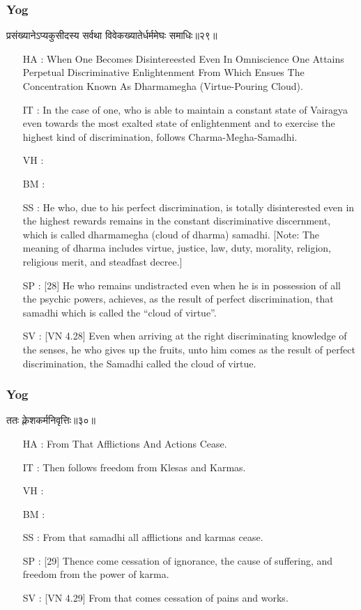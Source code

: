 \begin{frame}[fragile]\frametitle{Yog}
\begin{sanskrit}
प्रसंख्यानेऽप्यकुसीदस्य सर्वथा विवेकख्यातेर्धर्ममेघः समाधिः॥२९॥
\end{sanskrit}

	\begin{itemize}
	\item [HA]: When One Becomes Disintereested Even In Omniscience One Attains Perpetual Discriminative Enlightenment From Which Ensues The Concentration Known As Dharmamegha (Virtue-Pouring Cloud).
	\item [IT]: In the case of one, who is able to maintain a constant state of Vairagya even towards the most exalted state of enlightenment and to exercise the highest kind of discrimination, follows Charma-Megha-Samadhi.
	\item [VH]: 
	\item [BM]: 
	\item [SS]: He who, due to his perfect discrimination, is totally disinterested even in the highest rewards remains in the constant discriminative discernment, which is called dharmamegha (cloud of dharma) samadhi. [Note: The meaning of dharma includes virtue, justice, law, duty, morality, religion, religious merit, and steadfast decree.]
	\item [SP]: [28] He who remains undistracted even when he is in possession of all the psychic powers, achieves, as the result of perfect discrimination, that samadhi which is called the “cloud of virtue”.
	\item [SV]: [VN 4.28] Even when arriving at the right discriminating knowledge of the senses, he who gives up the fruits, unto him comes as the result of perfect discrimination, the Samadhi called the cloud of virtue. 
	\end{itemize}
\end{frame}


\begin{frame}[fragile]\frametitle{Yog}
\begin{sanskrit}
ततः क्लेशकर्मनिवृत्तिः॥३०॥
\end{sanskrit}

	\begin{itemize}
	\item [HA]: From That Afflictions And Actions Cease.
	\item [IT]: Then follows freedom from Klesas and Karmas.
	\item [VH]: 
	\item [BM]: 
	\item [SS]: From that samadhi all afflictions and karmas cease.
	\item [SP]: [29] Thence come cessation of ignorance, the cause of suffering, and freedom from the power of karma.
	\item [SV]: [VN 4.29] From that comes cessation of pains and works. 
	\end{itemize}
\end{frame}


